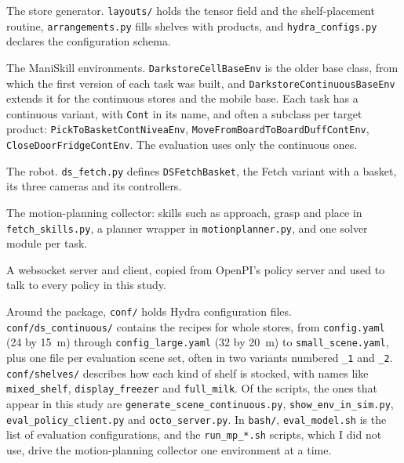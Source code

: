 \begin{description}[leftmargin=2em,style=nextline,itemsep=0.25em]
\item[\texttt{dsynth/scene\_gen}] The store generator. \texttt{layouts/} holds the tensor field and the shelf-placement routine, \texttt{arrangements.py} fills shelves with products, and \texttt{hydra\_configs.py} declares the configuration schema.
\item[\texttt{dsynth/envs}] The ManiSkill environments. \texttt{DarkstoreCellBaseEnv} is the older base class, from which the first version of each task was built, and \texttt{DarkstoreContinuousBaseEnv} extends it for the continuous stores and the mobile base. Each task has a continuous variant, with \texttt{Cont} in its name, and often a subclass per target product: \texttt{PickToBasketContNiveaEnv}, \texttt{MoveFromBoardToBoardDuffContEnv}, \texttt{CloseDoorFridgeContEnv}. The evaluation uses only the continuous ones.
\item[\texttt{dsynth/robots}] The robot. \texttt{ds\_fetch.py} defines \texttt{DSFetchBasket}, the Fetch variant with a basket, its three cameras and its controllers.
\item[\texttt{dsynth/planning}] The motion-planning collector: skills such as approach, grasp and place in \texttt{fetch\_skills.py}, a planner wrapper in \texttt{motionplanner.py}, and one solver module per task.
\item[\texttt{dsynth/web\_utils.py}] A websocket server and client, copied from OpenPI's policy server and used to talk to every policy in this study.
\end{description}

Around the package, \texttt{conf/} holds Hydra configuration files. \texttt{conf/ds\_continuous/} contains the recipes for whole stores, from \texttt{config.yaml} (24 by 15~m) through \texttt{config\_large.yaml} (32 by 20~m) to \texttt{small\_scene.yaml}, plus one file per evaluation scene set, often in two variants numbered \texttt{\_1} and \texttt{\_2}. \texttt{conf/shelves/} describes how each kind of shelf is stocked, with names like \texttt{mixed\_shelf}, \texttt{display\_freezer} and \texttt{full\_milk}. Of the scripts, the ones that appear in this study are \texttt{generate\_scene\_continuous.py}, \texttt{show\_env\_in\_sim.py}, \texttt{eval\_policy\_client.py} and \texttt{octo\_server.py}. In \texttt{bash/}, \texttt{eval\_model.sh} is the list of evaluation configurations, and the \texttt{run\_mp\_*.sh} scripts, which I did not use, drive the motion-planning collector one environment at a time.

